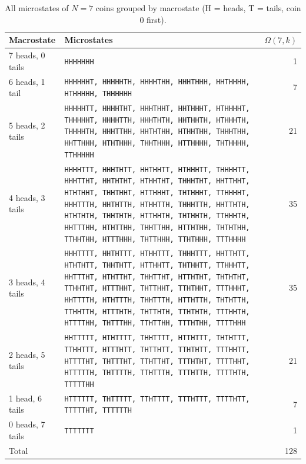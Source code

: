 \documentclass[11pt,a4paper]{article}
\begin{document}
\begin{table}[htbp]\centering\small
\caption{All microstates of $N=7$ coins grouped by macrostate (H = heads, T = tails, coin 0 first).}\label{tab:n7}
\begin{tabular}{@{}p{}p{}r@{}}
\toprule
Macrostate & Microstates & $\Omega(7,k)$ \\
\midrule
7 heads, 0 tails & \texttt{HHHHHHH} & 1 \\
6 heads, 1 tail & \texttt{HHHHHHT, HHHHHTH, HHHHTHH, HHHTHHH, HHTHHHH, HTHHHHH, THHHHHH} & 7 \\
5 heads, 2 tails & \texttt{HHHHHTT, HHHHTHT, HHHTHHT, HHTHHHT, HTHHHHT, THHHHHT, HHHHTTH, HHHTHTH, HHTHHTH, HTHHHTH, THHHHTH, HHHTTHH, HHTHTHH, HTHHTHH, THHHTHH, HHTTHHH, HTHTHHH, THHTHHH, HTTHHHH, THTHHHH, TTHHHHH} & 21 \\
4 heads, 3 tails & \texttt{HHHHTTT, HHHTHTT, HHTHHTT, HTHHHTT, THHHHTT, HHHTTHT, HHTHTHT, HTHHTHT, THHHTHT, HHTTHHT, HTHTHHT, THHTHHT, HTTHHHT, THTHHHT, TTHHHHT, HHHTTTH, HHTHTTH, HTHHTTH, THHHTTH, HHTTHTH, HTHTHTH, THHTHTH, HTTHHTH, THTHHTH, TTHHHTH, HHTTTHH, HTHTTHH, THHTTHH, HTTHTHH, THTHTHH, TTHHTHH, HTTTHHH, THTTHHH, TTHTHHH, TTTHHHH} & 35 \\
3 heads, 4 tails & \texttt{HHHTTTT, HHTHTTT, HTHHTTT, THHHTTT, HHTTHTT, HTHTHTT, THHTHTT, HTTHHTT, THTHHTT, TTHHHTT, HHTTTHT, HTHTTHT, THHTTHT, HTTHTHT, THTHTHT, TTHHTHT, HTTTHHT, THTTHHT, TTHTHHT, TTTHHHT, HHTTTTH, HTHTTTH, THHTTTH, HTTHTTH, THTHTTH, TTHHTTH, HTTTHTH, THTTHTH, TTHTHTH, TTTHHTH, HTTTTHH, THTTTHH, TTHTTHH, TTTHTHH, TTTTHHH} & 35 \\
2 heads, 5 tails & \texttt{HHTTTTT, HTHTTTT, THHTTTT, HTTHTTT, THTHTTT, TTHHTTT, HTTTHTT, THTTHTT, TTHTHTT, TTTHHTT, HTTTTHT, THTTTHT, TTHTTHT, TTTHTHT, TTTTHHT, HTTTTTH, THTTTTH, TTHTTTH, TTTHTTH, TTTTHTH, TTTTTHH} & 21 \\
1 head, 6 tails & \texttt{HTTTTTT, THTTTTT, TTHTTTT, TTTHTTT, TTTTHTT, TTTTTHT, TTTTTTH} & 7 \\
0 heads, 7 tails & \texttt{TTTTTTT} & 1 \\
\midrule
Total & & 128 \\
\bottomrule
\end{tabular}
\end{table}
\end{document}
